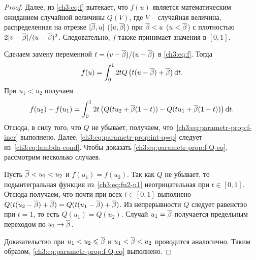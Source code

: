 {\begin{proof}
  Далее, из \eqref{ch3:eq:f} вытекает, что $f(u)$ является математическим ожиданием случайной величины $Q(V)$, где $V$ -- случайная величина, распределенная на отрезке $[{{\overline{\beta}}}, u]$ ($[u, {{\overline{\beta}}}]$) при ${{\overline{\beta}}} < u$ ($u < {{\overline{\beta}}}$) с плотностью $2|v-{{\overline{\beta}}}|/(u-{{\overline{\beta}}})^2$.
  Следовательно, $f$ также принимает значения в $[0, 1]$.

  Сделаем замену переменной $t = (v - {{\overline{\beta}}})/(u - {{\overline{\beta}}})$ в \eqref{ch3:eq:f}. Тогда
  \begin{equation*}
    f(u) = \int_0^1 2 t Q \left( t(u - {{\overline{\beta}}}) + {{\overline{\beta}}} \right) \mathop{}\!\mathrm{d} t.
  \end{equation*}
  При $u_1 < u_2$ получаем
  \begin{equation}
    \label{ch3:eq:fu2-u1}
    f(u_2) - f(u_1) =
    \int_0^1 2t \left( 
      Q(t u_2 + {{\overline{\beta}}}(1-t)) - Q(t u_1 + {{\overline{\beta}}} (1-t))
    \right) \mathop{}\!\mathrm{d} t.
  \end{equation}
  Отсюда, в силу того, что $Q$ не убывает, получаем, что~\eqref{ch3:eq:parametr-prop:f-incr} выполнено.
  Далее, \eqref{ch3:eq:parametr-prop:int-q=p} следует из~\eqref{ch3:eq:lambda-cond}.
  Чтобы доказать \eqref{ch3:eq:parametr-prop:f-Q-eq}, рассмотрим несколько случаев.

  Пусть ${{\overline{\beta}}} < u_1 < u_2$ и $f(u_1) = f(u_2)$.
  Так как $Q$ не убывает, то подынтегральная функция из~\eqref{ch3:eq:fu2-u1} неотрицательная при $t \in [0, 1]$. 
  Отсюда получаем, что почти при всех $t \in [0, 1]$ выполнено $ Q(t(u_2 - {{\overline{\beta}}}) + {{\overline{\beta}}}) = Q(t(u_1 - {{\overline{\beta}}}) + {{\overline{\beta}}})$.
  Из непрерывности $Q$ следует равенство при $t = 1$, то есть $Q(u_1) = Q(u_2)$.
  Случай $u_1 = {{\overline{\beta}}}$ получается предельным переходом по $u_1 \rightarrow {{\overline{\beta}}}$.

  Доказательство при $u_1 < u_2 \leqslant {{\overline{\beta}}}$ и $u_1 < {{\overline{\beta}}} < u_2$ проводится аналогично.
  Таким образом, \eqref{ch3:eq:parametr-prop:f-Q-eq} выполнено.
\end{proof}

}

